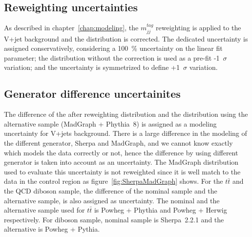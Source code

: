 \subsection{Reweighting uncertainties}
As described in chapter~\ref{chap:modeling}, the $m^{tag}_{jj}$ reweighting is applied to the V+jet background and the distribution is corrected. 
The dedicated uncertainty is assigned conservatively, considering a 100~\% uncertainty on the linear fit parameter; the distribution without the correction is used as a pre-fit -1~$\sigma$ variation; and the uncertainty is symmetrized to define +1~$\sigma$ variation. 

\subsection{Generator difference uncertainites}
The difference of the after reweighting distribution and the distribution using the alternative sample (MadGraph + Phythia~8) is assigned as a modeling uncertainty for V+jets background. There is a large difference in the modeling of the different generator, Sherpa and MadGraph, and we cannot know exactly which models the data correctly or not, hence the difference by using different generator is taken into account as an uncertainty. The MadGraph distribution used to evaluate this uncertainty is not reweighted since it is well match to the data in the control region as figure~\ref{fig:SherpaMadGraph} shows.
For the $t\bar{t}$ and the QCD diboson sample, the difference of the nominal sample and the alternative sample, is also assigned as uncertainty.
The nominal and the alternative sample used for $t\bar{t}$ is Powheg + Phythia and Powheg + Herwig respectively.
For diboson sample, nominal sample is Sherpa~2.2.1 and the alternative is Powheg + Pythia.

